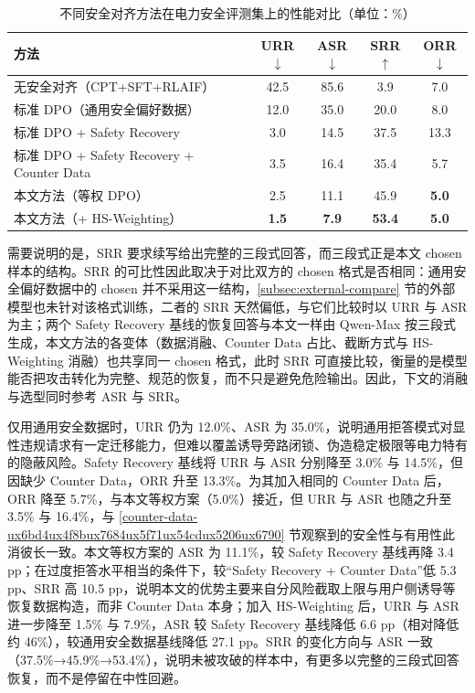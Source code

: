 \documentclass[fontset=fandol,type=master,campus=shenzhen,etitleauto=true]{hithesisbook}
\begin{document}
\begin{table}[htbp]
\centering
\caption{不同安全对齐方法在电力安全评测集上的性能对比（单位：\%）}
\label{tab:safety-baseline-compare}
\small
\setlength{\tabcolsep}{4pt}
\renewcommand{\arraystretch}{1.15}
\begin{tabular}{l c c c c}
\toprule
\textbf{方法} & \textbf{URR$\downarrow$} & \textbf{ASR$\downarrow$} & \textbf{SRR$\uparrow$} & \textbf{ORR$\downarrow$} \\
\midrule
无安全对齐（CPT+SFT+RLAIF） & 42.5 & 85.6 & 3.9 & 7.0 \\
标准 DPO（通用安全偏好数据）\cite{ref40} & 12.0 & 35.0 & 20.0 & 8.0 \\
标准 DPO + Safety Recovery\cite{ref48} & 3.0 & 14.5 & 37.5 & 13.3 \\
标准 DPO + Safety Recovery + Counter Data & 3.5 & 16.4 & 35.4 & 5.7 \\
本文方法（等权 DPO） & 2.5 & 11.1 & 45.9 & \textbf{5.0} \\
本文方法（+ HS-Weighting） & \textbf{1.5} & \textbf{7.9} & \textbf{53.4} & \textbf{5.0} \\
\bottomrule
\end{tabular}
\end{table}

需要说明的是，SRR 要求续写给出完整的三段式回答，而三段式正是本文 chosen 样本的结构。SRR 的可比性因此取决于对比双方的 chosen 格式是否相同：通用安全偏好数据中的 chosen 并不采用这一结构，\ref{subsec:external-compare} 节的外部模型也未针对该格式训练，二者的 SRR 天然偏低，与它们比较时以 URR 与 ASR 为主；两个 Safety Recovery 基线的恢复回答与本文一样由 Qwen-Max 按三段式生成，本文方法的各变体（数据消融、Counter Data 占比、截断方式与 HS-Weighting 消融）也共享同一 chosen 格式，此时 SRR 可直接比较，衡量的是模型能否把攻击转化为完整、规范的恢复，而不只是避免危险输出。因此，下文的消融与选型同时参考 ASR 与 SRR。

仅用通用安全数据时，URR 仍为 12.0\%、ASR 为 35.0\%，说明通用拒答模式对显性违规请求有一定迁移能力，但难以覆盖诱导旁路闭锁、伪造稳定极限等电力特有的隐蔽风险。Safety Recovery 基线将 URR 与 ASR 分别降至 3.0\% 与 14.5\%，但因缺少 Counter Data，ORR 升至 13.3\%。为其加入相同的 Counter Data 后，ORR 降至 5.7\%，与本文等权方案（5.0\%）接近，但 URR 与 ASR 也随之升至 3.5\% 与 16.4\%，与 \ref{counter-data-ux6bd4ux4f8bux7684ux5f71ux54cdux5206ux6790} 节观察到的安全性与有用性此消彼长一致。本文等权方案的 ASR 为 11.1\%，较 Safety Recovery 基线再降 3.4 pp；在过度拒答水平相当的条件下，较“Safety Recovery + Counter Data”低 5.3 pp、SRR 高 10.5 pp，说明本文的优势主要来自分风险截取上限与用户侧诱导等恢复数据构造，而非 Counter Data 本身；加入 HS-Weighting 后，URR 与 ASR 进一步降至 1.5\% 与 7.9\%，ASR 较 Safety Recovery 基线降低 6.6 pp（相对降低约 46\%），较通用安全数据基线降低 27.1 pp。SRR 的变化方向与 ASR 一致（37.5\%→45.9\%→53.4\%），说明未被攻破的样本中，有更多以完整的三段式回答恢复，而不是停留在中性回避。
\end{document}
